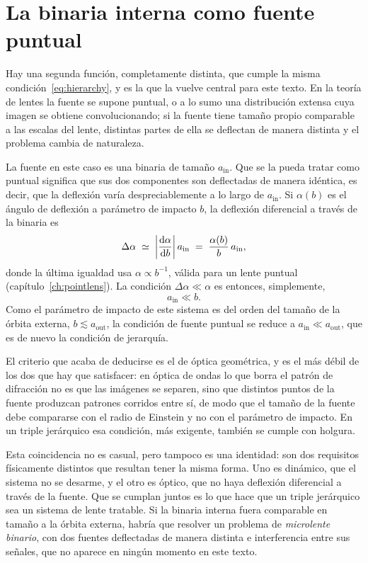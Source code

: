 \documentclass[11pt,a4paper,openany]{book}
\newcommand{\ain}{a_{\mathrm{in}}}
\newcommand{\aout}{a_{\mathrm{out}}}
\begin{document}
\section{La binaria interna como fuente puntual}
\label{sec:puntual}

Hay una segunda funci\'on, completamente distinta, que cumple la misma
condici\'on~\eqref{eq:hierarchy}, y es la que la vuelve central para este
texto. En la teor\'ia de lentes la fuente se supone puntual, o a lo sumo una
distribuci\'on extensa cuya imagen se obtiene convolucionando; si la fuente
tiene tama\~no propio comparable a las escalas del lente, distintas partes de
ella se deflectan de manera distinta y el problema cambia de naturaleza.

La fuente en este caso es una binaria de tama\~no $\ain$. Que se la pueda
tratar como puntual significa que sus dos componentes son deflectadas de
manera id\'entica, es decir, que la deflexi\'on var\'ia despreciablemente a lo
largo de $\ain$. Si $\alpha(b)$ es el \'angulo de deflexi\'on a par\'ametro de
impacto $b$, la deflexi\'on diferencial a trav\'es de la binaria es
\begin{equation}
  \Delta\alpha\;\simeq\;\left|\dv{\alpha}{b}\right|\ain
  \;=\;\frac{\alpha(b)}{b}\,\ain ,
  \label{eq:diffdefl}
\end{equation}
donde la \'ultima igualdad usa $\alpha\propto b^{-1}$, v\'alida para un lente
puntual (cap\'itulo~\ref{ch:pointlens}). La condici\'on
$\Delta\alpha\ll\alpha$ es entonces, simplemente,
\begin{equation}
  \ain\ll b .
  \label{eq:pointsource}
\end{equation}
Como el par\'ametro de impacto de este sistema es del orden del tama\~no de la
\'orbita externa, $b\lesssim\aout$, la condici\'on de fuente puntual se reduce
a $\ain\ll\aout$, que es de nuevo la condici\'on de jerarqu\'ia.

El criterio que acaba de deducirse es el de \'optica geom\'etrica, y es el m\'as
d\'ebil de los dos que hay que satisfacer: en \'optica de ondas lo que borra el
patr\'on de difracci\'on no es que las im\'agenes se separen, sino que
distintos puntos de la fuente produzcan patrones corridos entre s\'i, de modo
que el tama\~no de la fuente debe compararse con el radio de Einstein y no con
el par\'ametro de impacto. En un triple jer\'arquico esa condici\'on, m\'as
exigente, tambi\'en se cumple con holgura.

Esta coincidencia no es casual, pero tampoco es una identidad: son dos
requisitos f\'isicamente distintos que resultan tener la misma forma. Uno es
din\'amico, que el sistema no se desarme, y el otro es \'optico, que no haya
deflexi\'on diferencial a trav\'es de la fuente. Que se cumplan juntos es lo
que hace que un triple jer\'arquico sea un sistema de lente tratable. Si la
binaria interna fuera comparable en tama\~no a la \'orbita externa, habr\'ia
que resolver un problema de \emph{microlente binario}, con dos fuentes
deflectadas de manera distinta e interferencia entre sus se\~nales, que no
aparece en ning\'un momento en este texto.
\end{document}
